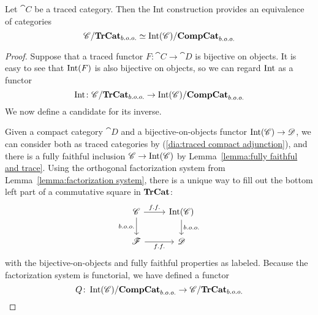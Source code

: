 \documentclass[12pt,oneside,article,draft]{memoir}
\begin{document}
\begin{proposition}\label{prop:slice boo int}
	Let $\cat{C}$ be a traced category. Then the Int construction provides an equivalence of categories
	\[
		\mathscr{C}/\mathbf{TrCat}_{b.o.o.} \simeq \operatorname{Int}(\mathscr{C})/\mathbf{CompCat}_{b.o.o.}
	\]
\end{proposition}

\begin{proof}

Suppose that a traced functor $F\colon\cat{C}\to\cat{D}$ is bijective on objects. It is easy to see that $\operatorname{Int}(F)$ is also bijective on objects, so we can regard $\operatorname{Int}$ as a functor 
$$\operatorname{Int}\colon\mathscr{C}/\mathbf{TrCat}_{b.o.o.} \to\operatorname{Int}(\mathscr{C})/\mathbf{CompCat}_{b.o.o.}$$
We now define a candidate for its inverse. 

Given a compact category $\cat{D}$ and a bijective-on-objects functor $\operatorname{Int}(\mathscr{C})\to\mathscr{D}$, we can consider both as traced categories by (\ref{dia:traced compact adjunction}), and there is a fully faithful inclusion $\mathscr{C}\to\operatorname{Int}(\mathscr{C})$ by Lemma~\ref{lemma:fully faithful and trace}. Using the orthogonal factorization system from Lemma~\ref{lemma:factorization system}, there is a unique way to fill out the bottom left part of a commutative square in $\mathbf{TrCat}$:
\begin{equation}\label{dia:factoring square}
\begin{tikzcd}
\cat{C}\arrow[r,"f.f."]\arrow[d,"b.o.o."']&\Int(\cat{C})\arrow[d,"b.o.o."]\\
\cat{F}\arrow[r,"f.f."']&\cat{D}
\end{tikzcd}
\end{equation}
with the bijective-on-objects and fully faithful properties as labeled. Because the factorization system is functorial, we have defined a functor
$$Q\colon\operatorname{Int}(\mathscr{C})/\mathbf{CompCat}_{b.o.o.}\to\mathscr{C}/\mathbf{TrCat}_{b.o.o.}$$


\end{proof}
\end{document}
